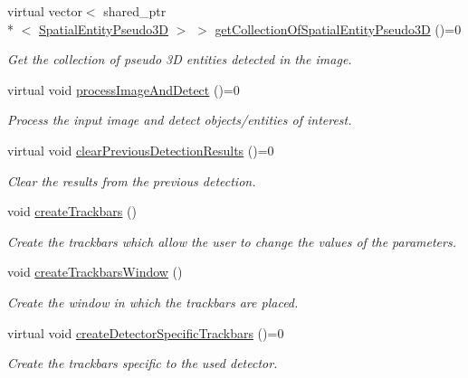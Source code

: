 \begin{DoxyCompactItemize}
virtual vector$<$ shared\-\_\-ptr\\*
$<$ \hyperlink{classmultiscale_1_1analysis_1_1SpatialEntityPseudo3D}{Spatial\-Entity\-Pseudo3\-D} $>$ $>$ \hyperlink{classmultiscale_1_1analysis_1_1Detector_a684a7071aca4173e3dc968d8635bd92a}{get\-Collection\-Of\-Spatial\-Entity\-Pseudo3\-D} ()=0
\begin{DoxyCompactList}\small\item\em Get the collection of pseudo 3\-D entities detected in the image. \end{DoxyCompactList}\item 
virtual void \hyperlink{classmultiscale_1_1analysis_1_1Detector_a7451855e415300f15765082f21588f13}{process\-Image\-And\-Detect} ()=0
\begin{DoxyCompactList}\small\item\em Process the input image and detect objects/entities of interest. \end{DoxyCompactList}\item 
virtual void \hyperlink{classmultiscale_1_1analysis_1_1Detector_a3c2add35193ad09a0200003d0053da6b}{clear\-Previous\-Detection\-Results} ()=0
\begin{DoxyCompactList}\small\item\em Clear the results from the previous detection. \end{DoxyCompactList}\item 
void \hyperlink{classmultiscale_1_1analysis_1_1Detector_a3d406aaa4dc8e9f8adbee3d7818cf1de}{create\-Trackbars} ()
\begin{DoxyCompactList}\small\item\em Create the trackbars which allow the user to change the values of the parameters. \end{DoxyCompactList}\item 
void \hyperlink{classmultiscale_1_1analysis_1_1Detector_afdf4c74184888dbd112d0f1cec3776cd}{create\-Trackbars\-Window} ()
\begin{DoxyCompactList}\small\item\em Create the window in which the trackbars are placed. \end{DoxyCompactList}\item 
virtual void \hyperlink{classmultiscale_1_1analysis_1_1Detector_a930ad07f5b8d9f21e6758341f71ae31a}{create\-Detector\-Specific\-Trackbars} ()=0
\begin{DoxyCompactList}\small\item\em Create the trackbars specific to the used detector. \end{DoxyCompactList}\item 

\end{DoxyCompactItemize}
